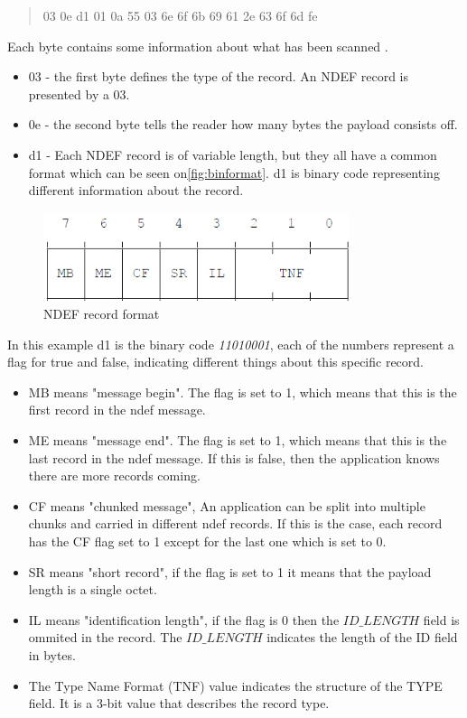 \begin{quote}
03 0e d1 01 0a 55 03 6e 6f 6b 69 61 2e 63 6f 6d fe
\end{quote}

Each byte contains some information about what has been scanned \citep{ndef}.

\begin{itemize}
\item 03 - the first byte defines the type of the record. An NDEF record is presented by a 03.
\item 0e - the second byte tells the reader how many bytes the payload consists off.
\item d1 - Each NDEF record is of variable length, but they all have a common format which can be seen on\autoref{fig:binformat}. d1 is binary code representing different information about the record.
\end{itemize}

\begin{figure}[H]
\centering
\includegraphics[width=0.8\textwidth]{img/binformat.png}
\caption{NDEF record format\citep{ndef}}
\label{fig:binformat}
\end{figure}

In this example d1 is the binary code \textit{11010001}, each of the numbers represent a flag for true and false, indicating different things about this specific record\citep{ndef}. 

\begin{itemize}
\item MB means "message begin". The flag is set to 1, which means that this is the first record in the \ac{ndef} message.
\item ME means "message end". The flag is set to 1, which means that this is the last record in the \ac{ndef} message. If this is false, then the application knows there are more records coming.
\item CF means "chunked message", An application can be split into multiple chunks and carried in different \ac{ndef} records. If this is the case, each record has the CF flag set to 1 except for the last one which is set to 0.
\item SR means "short record", if the flag is set to 1 it means that the payload length is a single octet. 
\item IL means "identification length", if the flag is 0 then the $ID\_LENGTH$ field is ommited in the record. The $ID\_LENGTH$ indicates the length of the ID field in bytes\citep{ndefformat}.
\item The Type Name Format (TNF) value indicates the structure of the TYPE field. It is a 3-bit value that describes the record type\citep{ndefformat}.
\end{itemize}

